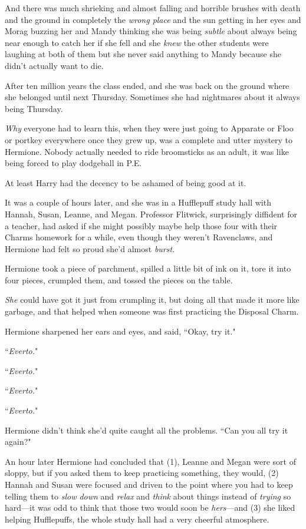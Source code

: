 And there was much shrieking and almost falling and horrible brushes with death and the ground in completely the \emph{wrong place} and the sun getting in her eyes and Morag buzzing her and Mandy thinking she was being \emph{subtle} about always being near enough to catch her if she fell and she \emph{knew} the other students were laughing at both of them but she never said anything to Mandy because she didn't actually want to die.

After ten million years the class ended, and she was back on the ground where she belonged until next Thursday. Sometimes she had nightmares about it always being Thursday.

\emph{Why} everyone had to learn this, when they were just going to Apparate or Floo or portkey everywhere once they grew up, was a complete and utter mystery to Hermione. Nobody actually needed to ride broomsticks as an adult, it was like being forced to play dodgeball in P.E.

At least Harry had the decency to be ashamed of being good at it.

\later

It was a couple of hours later, and she was in a Hufflepuff study hall with Hannah, Susan, Leanne, and Megan. Professor Flitwick, surprisingly diffident for a teacher, had asked if she might possibly maybe help those four with their Charms homework for a while, even though they weren't Ravenclaws, and Hermione had felt so proud she'd almost \emph{burst}.

Hermione took a piece of parchment, spilled a little bit of ink on it, tore it into four pieces, crumpled them, and tossed the pieces on the table.

\emph{She} could have got it just from crumpling it, but doing all that made it more like garbage, and that helped when someone was first practicing the Disposal Charm.

Hermione sharpened her ears and eyes, and said, ``Okay, try it."

``\emph{Everto.}"

``\emph{Everto.}"

``\emph{Everto.}"

``\emph{Everto.}"

Hermione didn't think she'd quite caught all the problems. ``Can you all try it again?"

An hour later Hermione had concluded that (1), Leanne and Megan were sort of sloppy, but if you asked them to keep practicing something, they would, (2) Hannah and Susan were focused and driven to the point where you had to keep telling them to \emph{slow down} and \emph{relax} and \emph{think} about things instead of \emph{trying} so hard—it was odd to think that those two would soon be \emph{hers}—and (3) she liked helping Hufflepuffs, the whole study hall had a very cheerful atmosphere.

